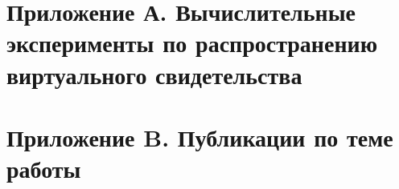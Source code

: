 \documentclass[14pt]{matmex-diploma-custom}
\begin{document}
\setmonofont[Mapping=tex-text]{CMU Typewriter Text}



\section*{Приложение А. Вычислительные эксперименты по распространению виртуального свидетельства}



\section*{Приложение B. Публикации по теме работы}

\end{document}
